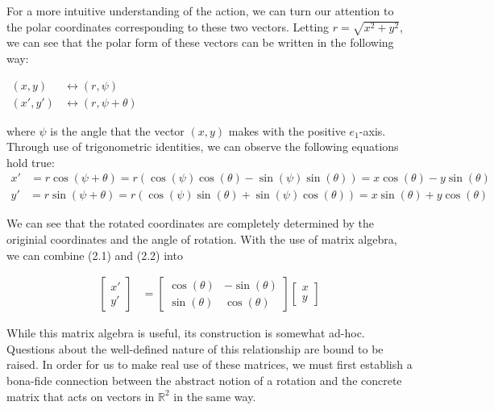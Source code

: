 \documentclass[10pt]{ucthesis}
\newcommand{\R}{\mathbb{R}}
\begin{document}
For a more intuitive understanding of the action, we can turn our attention to the polar coordinates corresponding to these two vectors. Letting $r = \sqrt{x^2 + y^2}$, we can see that the polar form of these vectors can be written in the following way:
\begin{center}
	$\begin{aligned}
		(x,y) &\leftrightarrow (r,\psi)\\
		(x',y') &\leftrightarrow (r,\psi+\theta)
	\end{aligned}$
\end{center}
where $\psi$ is the angle that the vector $(x,y)$ makes with the positive $e_1$-axis. Through use of trigonometric identities, we can observe the following equations hold true:
\begin{equation}
	\begin{aligned}
		x' &= r\cos(\psi+\theta) = r\left(\cos(\psi)\cos(\theta) - \sin(\psi)\sin(\theta)\right) = x\cos(\theta) -y\sin(\theta)
	\end{aligned}
\end{equation}
\begin{equation}
	\begin{aligned}
		y' &= r\sin(\psi+\theta) = r\left(\cos(\psi)\sin(\theta) + \sin(\psi)\cos(\theta)\right) = x\sin(\theta) +y\cos(\theta)
	\end{aligned}
\end{equation}

We can see that the rotated coordinates are completely determined by the originial coordinates and the angle of rotation. With the use of matrix algebra, we can combine (2.1) and (2.2) into 

\begin{equation}
	\begin{aligned}
		\begin{bmatrix}
			x' \\
			y'
		\end{bmatrix} &=
		\begin{bmatrix}
			\cos(\theta) & -\sin(\theta) \\
			\sin(\theta) & \cos(\theta)
		\end{bmatrix}
		\begin{bmatrix}
			x \\
			y
		\end{bmatrix}
	\end{aligned}
\end{equation}

While this matrix algebra is useful, its construction is somewhat ad-hoc. Questions about the well-defined nature of this relationship are bound to be raised. In order for us to make real use of these matrices, we must first establish a bona-fide connection between the abstract notion of a rotation and the concrete matrix that acts on vectors in $\R^2$ in the same way.
\end{document}
